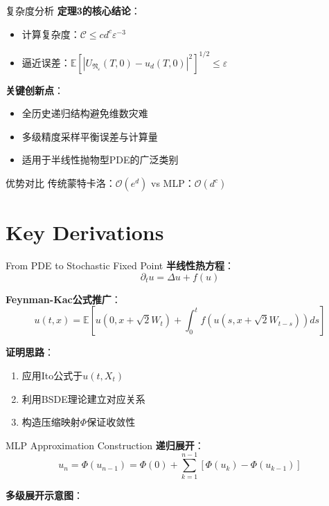 \documentclass[aspectratio=169]{beamer}
\begin{document}
	\begin{frame}{复杂度分析}
		\textbf{定理3的核心结论}：
		\begin{itemize}
			\item 计算复杂度：$\mathcal{C} \leq cd^c \varepsilon^{-3}$
			\item 逼近误差：$\mathbb{E}[|U_{\mathfrak{N}_\varepsilon}(T,0)-u_d(T,0)|^2]^{1/2} \leq \varepsilon$
		\end{itemize}

		\textbf{关键创新点}：
		\begin{itemize}
			\item 全历史递归结构避免维数灾难
			\item 多级精度采样平衡误差与计算量
			\item 适用于半线性抛物型PDE的广泛类别
		\end{itemize}

		\begin{exampleblock}{优势对比}
		传统蒙特卡洛：$\mathcal{O}(e^d)$ vs MLP：$\mathcal{O}(d^c)$
		\end{exampleblock}
	\end{frame}

	\section{Key Derivations}
	\begin{frame}{From PDE to Stochastic Fixed Point}
		\textbf{半线性热方程}：
		\[
		\partial_t u = \Delta u + f(u)
		\]

		\textbf{Feynman-Kac公式推广}：
		\[
		u(t,x) = \mathbb{E}\left[ u(0,x+\sqrt{2}W_t) + \int_0^t f(u(s,x+\sqrt{2}W_{t-s}))ds \right]
		\]

		\textbf{证明思路}：
		\begin{enumerate}
			\item 应用Ito公式于$u(t,X_t)$
			\item 利用BSDE理论建立对应关系
			\item 构造压缩映射$\Phi$保证收敛性
		\end{enumerate}
	\end{frame}

	\begin{frame}{MLP Approximation Construction}
		\textbf{递归展开}：
		\[
		u_n = \Phi(u_{n-1}) = \Phi(0) + \sum_{k=1}^{n-1} [\Phi(u_k) - \Phi(u_{k-1})]
		\]

		\textbf{多级展开示意图}：
	\end{frame}

	\iffalse
\end{document}
